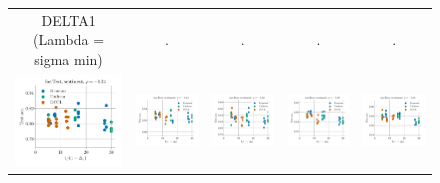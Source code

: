 \begin{figure}
\begin{tabular}{@{\hskip -0.0in}c@{\hskip -0.0in}c@{\hskip -0.0in}c@{\hskip -0.0in}c@{\hskip -0.0in}c@{\hskip -0.0in}}
		DELTA1 (Lambda = sigma min) & . & . & . & .\\
		\includegraphics[width=.2\linewidth]{figures/fasttext1m_sentiment_mr_test-acc_vs_gram-large-dim-delta1-2-trans_linx.pdf} &
		\includegraphics[width=.2\linewidth]{figures/fasttext1m_sentiment_subj_test-acc_vs_gram-large-dim-delta1-2-trans_linx.pdf} &
		\includegraphics[width=.2\linewidth]{figures/fasttext1m_sentiment_cr_test-acc_vs_gram-large-dim-delta1-2-trans_linx.pdf} &
		\includegraphics[width=.2\linewidth]{figures/fasttext1m_sentiment_sst_test-acc_vs_gram-large-dim-delta1-2-trans_linx.pdf} &
		\includegraphics[width=.2\linewidth]{figures/fasttext1m_sentiment_mpqa_test-acc_vs_gram-large-dim-delta1-2-trans_linx.pdf} \\
		

\end{tabular}
\end{figure}
